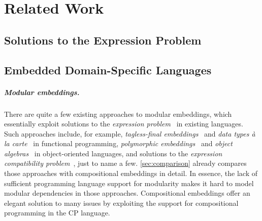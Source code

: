 \chapter{Related Work} \label{ch:related}

\section{Solutions to the Expression Problem}

\section{Embedded Domain-Specific Languages}

\paragraph{Modular embeddings.}
There are quite a few existing approaches to modular embeddings, which
essentially exploit solutions to the \emph{expression
problem}~\citep{wadler1998expression} in existing languages. Such approaches
include, for example, \emph{tagless-final embeddings}~\citep{carette2009finally}
and \emph{data types à la carte}~\citep{swierstra2008data} in functional
programming, \emph{polymorphic embeddings}~\citep{hofer2008polymorphic} and
\emph{object algebras}~\citep{oliveira2012extensibility} in object-oriented
languages, and solutions to the \emph{expression compatibility
problem}~\citep{haeri2016expression,haeri2019solving}, just to name a few.
\autoref{sec:comparison} already compares those approaches with compositional
embeddings in detail. In essence, the lack of sufficient programming language
support for modularity makes it hard to model modular dependencies in those
approaches. Compositional embeddings offer an elegant solution to many issues by
exploiting the support for compositional programming in the CP language.

